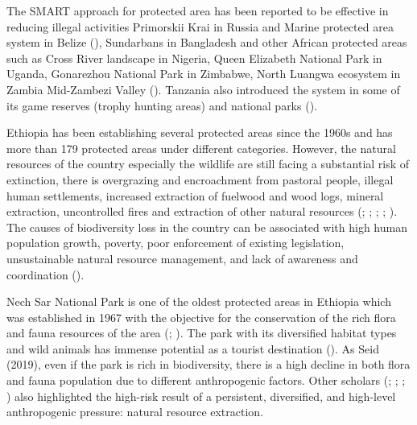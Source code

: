 \documentclass[
  letterpaper,
  DIV=11,
  numbers=noendperiod]{scrartcl}
\begin{document}
The SMART approach for protected area has been reported to be effective
in reducing illegal activities Primorskii Krai in Russia and Marine
protected area system in Belize (), Sundarbans in Bangladesh and other African
protected areas such as Cross River landscape in Nigeria, Queen
Elizabeth National Park in Uganda, Gonarezhou National Park in Zimbabwe,
North Luangwa ecosystem in Zambia Mid-Zambezi Valley
(). Tanzania also
introduced the system in some of its game reserves (trophy hunting
areas) and national parks ().

Ethiopia has been establishing several protected areas since the 1960s
and has more than 179 protected areas under different categories.
However, the natural resources of the country especially the wildlife
are still facing a substantial risk of extinction, there is overgrazing
and encroachment from pastoral people, illegal human settlements,
increased extraction of fuelwood and wood logs, mineral extraction,
uncontrolled fires and extraction of other natural resources
(;
;
;
;
). The causes of biodiversity
loss in the country can be associated with high human population growth,
poverty, poor enforcement of existing legislation, unsustainable natural
resource management, and lack of awareness and coordination
().

Nech Sar National Park is one of the oldest protected areas in Ethiopia
which was established in 1967 with the objective for the conservation of
the rich flora and fauna resources of the area
(; ). The park with its diversified habitat types and wild animals has
immense potential as a tourist destination (). As Seid (2019), even if the park is rich in biodiversity, there
is a high decline in both flora and fauna population due to different
anthropogenic factors. Other scholars (; ;
;
) also
highlighted the high-risk result of a persistent, diversified, and
high-level anthropogenic pressure: natural resource extraction.
\end{document}
